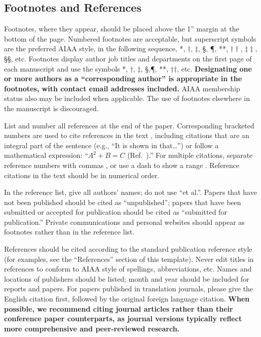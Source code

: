 \documentclass[journal ]{new-aiaa}
\begin{document}
\subsection{Footnotes and References}
Footnotes, where they appear, should be placed above the 1'' margin at the bottom of the page. Numbered footnotes are acceptable, but superscript symbols are the preferred AIAA style, in the following sequence, *, $\dag$, $\ddag$, \S, \P, **, $\dag\dag$, $\ddag\ddag$, \S\S, etc. Footnotes display author job titles and departments on the first page of each manuscript and use the symbols *, †, ‡, §,¶, **, ††, etc. \textbf{Designating one or more authors as a “corresponding author” is appropriate in the footnotes, with contact email addresses included.} AIAA membership status also may be included when applicable. The use of footnotes elsewhere in the manuscript is discouraged.

List and number all references at the end of the paper. Corresponding bracketed numbers are used to cite references in the text \cite{vatistas1986reverse}, including citations that are an integral part of the sentence (e.g., ``It is shown in \cite{dornheim1996planetary} that\ldots '') or follow a mathematical expression: ``$A^{2} + B = C$ (Ref.~\cite{terster1997nasa}).'' For multiple citations, separate reference numbers with commas \cite{peyret2012computational,oates1997aerothermodynamics}, or use a dash to show a range \cite{volpe1994techniques,thompsonspacecraft,chi1993fluid,brandis2016nonequi}. Reference citations in the text should be in numerical order. 

In the reference list, give all authors' names; do not use ``et al.''. Papers that have not been published should be cited as ``unpublished''; papers that have been submitted or accepted for publication should be cited as ``submitted for publication.'' Private communications and personal websites should appear as footnotes rather than in the reference list.

References should be cited according to the standard publication reference style (for examples, see the ``References'' section of this template). Never edit titles in references to conform to AIAA style of spellings, abbreviations, etc. Names and locations of publishers should be listed; month and year should be included for reports and papers. For papers published in translation journals, please give the English citation first, followed by the original foreign language citation. \textbf{When possible, we recommend citing journal articles rather than their conference paper counterparts, as journal versions typically reflect more comprehensive and peer-reviewed research.} 
\end{document}
